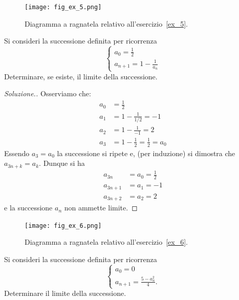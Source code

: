 \begin{figure}
 \begin{center}
    \texttt{[image: fig\_ex\_5.png]}
  \end{center}
  \caption{Diagramma a ragnatela relativo
    all'esercizio~\ref{ex_5}.}
  \label{fig_ex_5}
\end{figure}

\begin{exercise}\label{ex_5}
  Si consideri la successione definita per ricorrenza
  \[
  \begin{cases}
    a_0 = \frac 1 2\\
    a_{n+1} = 1- \frac{1}{a_n}
  \end{cases}
  \]
  Determinare, se esiste, il limite della successione.
\end{exercise}

\begin{proof}[Soluzione.]
  Osserviamo che:
  \begin{align*}
    a_0 &= \frac 1 2 \\
    a_1 &= 1 - \frac{1}{1/2} = -1\\
    a_2 &= 1 - \frac{1}{-1} = 2\\
    a_3 &= 1 - \frac{1}{2} = \frac 1 2 = a_0
  \end{align*}
  Essendo $a_3 = a_0$ la successione si ripete e, (per induzione) si
  dimostra che $a_{3n+k} = a_k$. Dunque si ha
  \begin{align*}
    a_{3n} &= a_0 = \frac 1 2\\
    a_{3n+1} &= a_1 = -1\\
    a_{3n+2} &= a_2 = 2
  \end{align*}
  e la successione $a_n$ non ammette limite.
\end{proof}

\begin{figure}
  \begin{center}
    \texttt{[image: fig\_ex\_6.png]}
  \end{center}
  \caption{Diagramma a ragnatela relativo
    all'esercizio~\ref{ex_6}.}
  \label{fig_ex_6}
\end{figure}

\begin{exercise}\label{ex_6}
  Si consideri la successione definita per ricorrenza
  \[
  \begin{cases}
    a_0 = 0\\
    a_{n+1} = \frac{5-a_n^2}{4}.
  \end{cases}
  \]
  Determinare il limite della successione.
\end{exercise}

